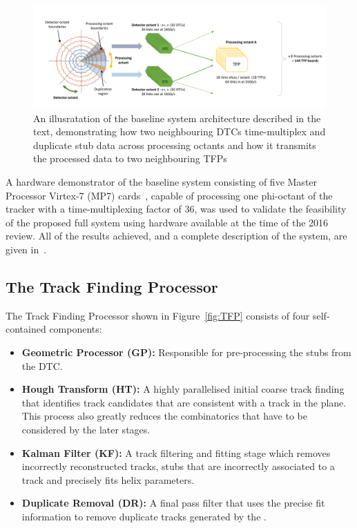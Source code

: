 \begin{figure}[t]
\centering
\includegraphics[width=1.00\textwidth]{figs/tk-upgrade/tmttarch.pdf}
\caption{An illusratation of the baseline system architecture described in the text, demonstrating how two neighbouring DTCs time-multiplex and duplicate stub data across processing octants and how it transmits the processed data to two neighbouring TFPs~\cite{TMTT_JINST}}
\label{fig:tmttarch}
\end{figure}

A hardware demonstrator of the baseline system consisting of five Master Processor Virtex-7 (MP7) cards~\cite{mp7ref}, capable of processing one phi-octant of the tracker with a time-multiplexing factor of 36, was used to validate the feasibility of the proposed full system using hardware available at the time of the 2016 review.
All of the results achieved, and a complete description of the system, are given in~\cite{TMTT_JINST}.

\subsection{The Track Finding Processor}\label{subsec:TFP}
The Track Finding Processor shown in Figure~\ref{fig:TFP} consists of four self-contained components:
\begin{itemize}
\item {\bf Geometric Processor (GP):} Responsible for pre-processing the stubs from the DTC.
\item {\bf Hough Transform (HT):} A highly parallelised initial coarse track finding that identifies track candidates that are consistent with a track in the \rphi plane. This process also greatly reduces the combinatorics that have to be considered by the later stages.
\item {\bf Kalman Filter (KF):} A track filtering and fitting stage which removes incorrectly reconstructed tracks, stubs that are incorrectly associated to a track and precisely fits helix parameters.
\item {\bf Duplicate Removal (DR):} A final pass filter that uses the precise fit information to remove duplicate tracks generated by the \HT.
\end{itemize}

